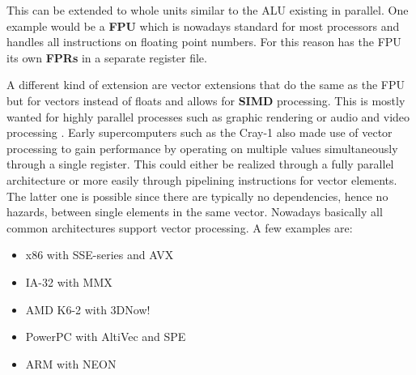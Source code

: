 This can be extended to whole units similar to the ALU existing in parallel.
One example would be a \textbf{\ac{FPU}} which is nowadays standard for most processors and handles all instructions on floating point numbers.
For this reason has the FPU its own \textbf{\acp{FPR}} in a separate register file.

A different kind of extension are vector extensions that do the same as the FPU but for vectors instead of floats and allows for \textbf{\ac{SIMD}} processing.
This is mostly wanted for highly parallel processes such as graphic rendering or audio and video processing .
Early supercomputers such as the Cray-1  also made use of vector processing to gain performance by operating on multiple values  simultaneously through a single register.
This could either be realized through a fully parallel architecture or more easily through pipelining instructions for vector elements.
The latter one is possible since there are typically no dependencies, hence no hazards, between single elements in the same vector.
Nowadays basically all common architectures support vector processing.
A few examples are:

\noindent\begin{minipage}[t]{\textwidth}
    \vspace{1em}
    \begin{minipage}[t]{0.4\textwidth}
\begin{itemize}
    \item x86 with SSE-series and AVX
    \item IA-32 with MMX
    \item AMD K6-2 with 3DNow!
\end{itemize}
\end{minipage}
\begin{minipage}[t]{0.6\textwidth}
\begin{itemize}
    \item PowerPC with AltiVec and SPE
    \item ARM with NEON
\end{itemize}
\end{minipage}
    \vspace{1em}
\end{minipage}


